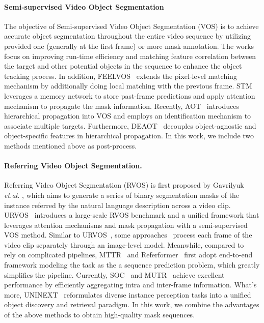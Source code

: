 \documentclass[10pt,twocolumn,letterpaper]{article}
\begin{document}
\paragraph{Semi-supervised Video Object Segmentation} 
The objective of Semi-supervised Video Object Segmentation (VOS) is to achieve accurate object segmentation throughout the entire video sequence by utilizing provided one (generally at the first frame) or more mask annotation.
The works~\cite{semi1,semi2} focus on improving run-time efficiency and matching feature correlation between the target and other potential objects in the sequence to enhance the object tracking process.
In addition, FEELVOS~\cite{feelvos} 
extends the pixel-level matching mechanism by additionally doing local matching with the previous frame.
STM~\cite{stm} leverages a memory network to store past-frame predictions and apply attention mechanism to propagate the mask information.
Recently, AOT~\cite{aot} introduces hierarchical propagation into VOS and employs an identification mechanism to associate multiple targets.
Furthermore, DEAOT~\cite{deaot} decouples object-agnostic and object-specific features in hierarchical propagation.
In this work, we include two methods mentioned above as post-process.

\paragraph{Referring Video Object Segmentation.} 
Referring Video Object Segmentation (RVOS) is first proposed by Gavrilyuk \textit{et.al.} \cite{GavrilyukGLS18}, which aims to generate a series of binary segmentation masks of the instance referred by the natural language description across a video clip.
URVOS~\cite{urvos} introduces a large-scale RVOS benchmark and a unified framework that leverages attention mechanisms and mask propagation with a semi-supervised VOS method.
Similar to URVOS~\cite{urvos}, some approaches~\cite{refvos,rel1} process each frame of the video clip separately through an image-level model.
Meanwhile, compared to~\cite{rvos1, rvos2} rely on complicated pipelines, MTTR~\cite{mttr} and Referformer~\cite{referformer} first adopt end-to-end framework modeling the task as the a sequence prediction problem, which greatly simplifies the pipeline.
Currently, SOC~\cite{soc} and MUTR~\cite{mutr} achieve excellent performance by efficiently aggregating intra and inter-frame information.
What's more, UNINEXT~\cite{UNINEXT} reformulates diverse instance perception tasks into a unified object discovery and retrieval paradigm.
In this work, we combine the advantages of the above methods to obtain high-quality mask sequences.
\end{document}
